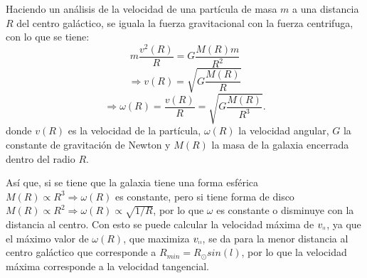 \documentclass[letterpaper,oneside]{article}
\begin{document}
Haciendo un análisis de la velocidad de una partícula de masa $m$ a una distancia $R$ del centro galáctico, se iguala la fuerza gravitacional con la fuerza centrifuga, con lo que se tiene:
\[
m\frac{v^2(R)}{R}=G\frac{M(R)m}{R^2}
\]
\[
 \Rightarrow v(R)=\sqrt{G\frac{M(R)}{R}} \tag{2.2} \label{eq:velocidad}
\]
\[
 \Rightarrow \omega(R)=\frac{v(R)}{R}=\sqrt{G\frac{M(R)}{R^3}}.  \tag{2.3} \label{eq:omega}
\]
donde $v(R)$ es la velocidad de la partícula, $\omega(R)$ la velocidad angular, $G$ la constante de gravitación de Newton y $M(R)$ la masa de la galaxia encerrada dentro del radio $R$.

Así que, si se tiene que la galaxia tiene una forma esférica $M(R) \propto R^3\Rightarrow\omega(R)$ es constante, pero si tiene forma de disco $M(R) \propto R^2\Rightarrow\omega(R)\propto \sqrt{1/R}$, por lo que $\omega$ es constante o disminuye con la distancia al centro. Con esto se puede calcular la velocidad máxima de $v_{\shortparallel}$, ya que el máximo valor de  $\omega(R)$, que maximiza $v_{\shortparallel}$, se da para la menor distancia al centro galáctico que corresponde a $R_{min}=R_{\odot}sin(l)$, por lo que la velocidad máxima corresponde a la velocidad tangencial.
\end{document}
